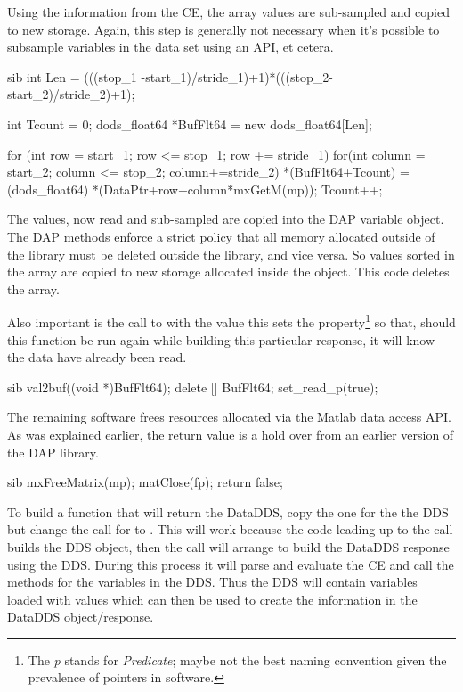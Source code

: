 \documentclass{dods-paper}
\begin{document}
Using the information from the CE, the array values are sub-sampled and copied
to new storage. Again, this step is generally not necessary when it's
possible to subsample variables in the data set using an API, et cetera.

\begin{vcode}{sib}
    int Len = (((stop_1 -start_1)/stride_1)+1)*(((stop_2-start_2)/stride_2)+1);
  
    int Tcount = 0;
    dods_float64 *BufFlt64 = new dods_float64[Len];    
  
    for (int row = start_1; row <= stop_1; row += stride_1) {          
        for(int column = start_2; column <= stop_2; column+=stride_2) {
            *(BufFlt64+Tcount) = (dods_float64) *(DataPtr+row+column*mxGetM(mp));  
            Tcount++;
        }
    }
\end{vcode}

The values, now read and sub-sampled are copied into the DAP variable object.
The DAP methods enforce a strict policy that all memory allocated outside of
the library must be deleted outside the library, and vice versa. So values
sorted in the  array are copied to new storage allocated inside
the  object. This code deletes the  array.

Also important is the call to  with the value 
this sets the  property\footnote{The \emph{p} stands for
\emph{Predicate}; maybe not the best naming convention given the prevalence
of pointers in \Cpp software.} so that, should this function be run again
while building this particular response, it will know the data have already
been read.
 
\begin{vcode}{sib}
    val2buf((void *)BufFlt64);
    delete [] BufFlt64;
    set_read_p(true);      
\end{vcode}

The remaining software frees resources allocated via the Matlab data access
API. As was explained earlier, the  return value is a hold over
from an earlier version of the DAP library. 

\begin{vcode}{sib}
    mxFreeMatrix(mp);
    matClose(fp);
    return false;
\end{vcode}

To build a  function that will return the DataDDS, copy the one
for the the DDS but change the call for  to
. This will work because the code leading up
to the  call builds the DDS object, then the
 call will arrange to build the DataDDS response using the
DDS. During this process it will parse and evaluate the CE and call the
 methods for the variables in the DDS. Thus the DDS will contain
variables loaded with values which can then be used to create the information
in the DataDDS object/response.
\end{document}
